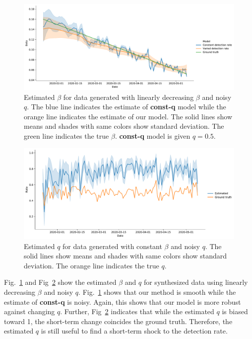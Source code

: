\documentclass{amsart}
\begin{document}
\begin{figure}[h]
 \centering
 \includegraphics[width=\linewidth]{fig/trend_beta.pdf}
 \caption{Estimated $\beta$ for data generated with linearly decreasing $\beta$ and noisy $q$. The blue line indicates the estimate of \textbf{const-q} model while the orange line indicates the estimate of our model. The solid lines show means and shades with same colors show standard deviation. The green line indicates the true $\beta$. \textbf{const-q} model is given $q=0.5$.}
 \label{fig:trend-b}
\end{figure}

\begin{figure}[h]
 \centering
 \includegraphics[width=\linewidth]{fig/trend_q.pdf}
 \caption{Estimated $q$ for data generated with constant $\beta$ and noisy $q$. The solid lines show means and shades with same colors show standard deviation. The orange line indicates the true $q$.}
 \label{fig:trend-q}
\end{figure}

Fig.~\ref{fig:trend-b} and Fig~\ref{fig:trend-q} show the estimated $\beta$ and $q$ for synthesized data using linearly decreasing $\beta$ and noisy $q$.
Fig.~\ref{fig:trend-b} shows that our method is smooth while the estimate of \textbf{const-q} is noisy.
Again, this shows that our model is more robust against changing $q$.
Further, Fig~\ref{fig:trend-q} indicates that while the estimated $q$ is biased toward 1, the short-term change coincides the ground truth.
Therefore, the estimated $q$ is still useful to find a short-term shock to the detection rate.
\end{document}
